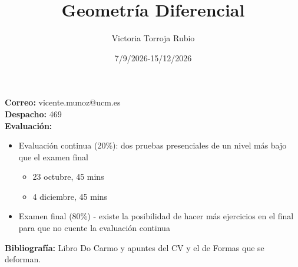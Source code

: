 \documentclass{report}
\begin{document}
\title{Geometría Diferencial}
\author{Victoria Torroja Rubio}
\date{7/9/2026-15/12/2026}

\maketitle

\tableofcontents

\pagebreak

\textbf{Correo:} vicente.munoz@ucm.es \\
\textbf{Despacho:} 469 \\
\textbf{Evaluación:} 
\begin{itemize}
\item Evaluación continua (20\%): dos pruebas presenciales de un nivel más bajo que el examen final
	\begin{itemize}
	\item 23 octubre, 45 mins
	\item 4 diciembre, 45 mins
	\end{itemize}
\item Examen final (80\%) - existe la posibilidad de hacer más ejercicios en el final para que no cuente la evaluación continua
\end{itemize}
\textbf{Bibliografía:} Libro Do Carmo y apuntes del CV y el de Formas que se deforman.





\appendix

\end{document}
